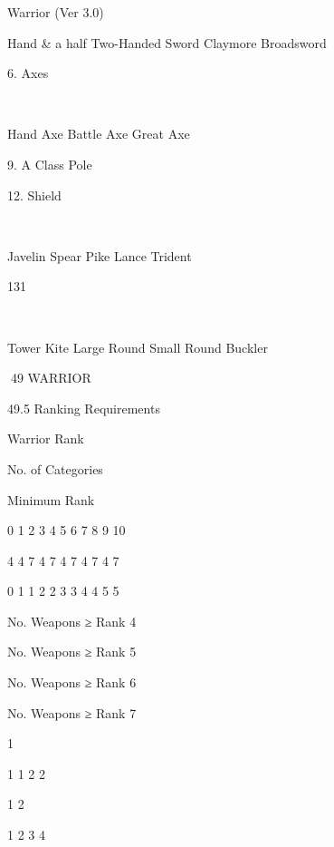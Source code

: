 \begin{Chapter}{Warrior (Ver 3.0)}
 
 
 
 

Hand \& a half  
Two-Handed Sword  
Claymore  
Broadsword 

6. Axes  

 
 
 

Hand Axe  
Battle Axe  
Great Axe 

9. A Class Pole  

12. Shield  

 
 
 
 
 

Javelin  
Spear  
Pike  
Lance  
Trident 

131 

 
 
 
 
 

Tower  
Kite  
Large Round  
Small Round  
Buckler 

49 WARRIOR 

49.5 Ranking Requirements 

Warrior Rank 

No. of Categories 

Minimum Rank 

0 
1 
2 
3 
4 
5 
6 
7 
8 
9 
10 
 

4 
4 
7 
4 
7 
4 
7 
4 
7 
4 
7 

0 
1 
1 
2 
2 
3 
3 
4 
4 
5 
5 

 

No. Weapons ≥ 
Rank 4 

No. Weapons ≥ 
Rank 5 

No. Weapons ≥ 
Rank 6 

No. Weapons ≥ 
Rank 7 

1 
 
 
 
 
 
 
 
 
 
 

 
1 
1 
2 
2 
 
 
 
 
 
 

 
 
 
 
 
1 
2 
 
 
 
 

 
 
 
 
 
 
 
1 
2 
3 
4 

\end{Chapter}
